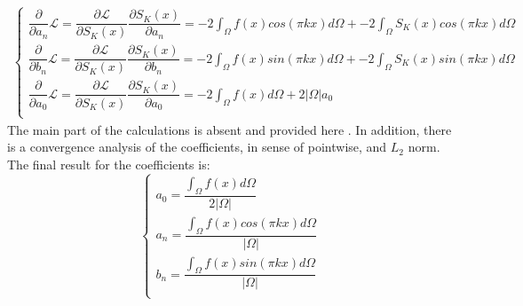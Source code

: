 \begin{equation}
 	\begin{multlined}
 		\begin{cases}
 			\dfrac{\partial }{\partial a_n} \mathcal{L} = \dfrac{\partial \mathcal{L}}{\partial S_K(x)} \dfrac{\partial S_K(x)}{\partial a_n}  = -2 {\displaystyle \int_{\Omega}} f(x) cos(\pi k x) d\Omega + -2 {\displaystyle \int_{\Omega}} S_K(x) cos(\pi k x) d\Omega \\[20pt]
 			\dfrac{\partial }{\partial b_n} \mathcal{L} = \dfrac{\partial \mathcal{L}}{\partial S_K(x)} \dfrac{\partial S_K(x)}{\partial b_n} = -2 {\displaystyle \int_{\Omega}} f(x) sin(\pi k x) d\Omega + -2 {\displaystyle \int_{\Omega}} S_K(x) sin(\pi k x) d\Omega \\[20pt]
 			\dfrac{\partial }{\partial a_0} \mathcal{L} = \dfrac{\partial \mathcal{L}}{\partial S_K(x)} \dfrac{\partial S_K(x)}{\partial a_0}  = -2 {\displaystyle \int_{\Omega}} f(x) d\Omega + 2 |\Omega| a_0 \\[20pt]
 		\end{cases}
 	\end{multlined}
\end{equation}
The main part of the calculations is absent and provided here \cite{fourierintro}. In addition, there is a convergence analysis of the coefficients, in sense of pointwise, and $L_2$ norm. The final result for the coefficients is:
\begin{equation}
	\begin{cases}
		a_0 = \dfrac{{\displaystyle \int_{\Omega}} f(x) d\Omega }{2 | \Omega |} \\[20pt]
		a_n = \dfrac{{\displaystyle \int_{\Omega}} f(x) cos(\pi k x) d\Omega}{| \Omega |} \\[20pt]
		b_n = \dfrac{{\displaystyle \int_{\Omega}} f(x) sin(\pi k x) d\Omega}{| \Omega |} \\[20pt]
	\end{cases}
\end{equation}

